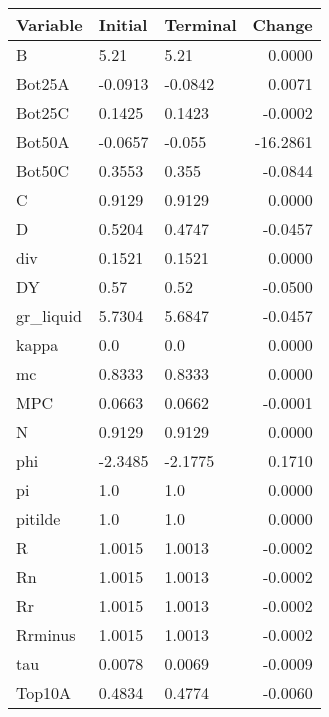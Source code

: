 \begin{table}
\centering
\label{tab:stst_comparison_fast_shock_limit_permanent}
\begin{tabular}{lllr}
\toprule
                Variable & Initial & Terminal &   Change \\
\midrule
                       B &    5.21 &     5.21 &   0.0000 \\
                  Bot25A & -0.0913 &  -0.0842 &   0.0071 \\
                  Bot25C &  0.1425 &   0.1423 &  -0.0002 \\
                  Bot50A & -0.0657 &   -0.055 & -16.2861 \\
                  Bot50C &  0.3553 &    0.355 &  -0.0844 \\
                       C &  0.9129 &   0.9129 &   0.0000 \\
                       D &  0.5204 &   0.4747 &  -0.0457 \\
                     div &  0.1521 &   0.1521 &   0.0000 \\
                      DY &    0.57 &     0.52 &  -0.0500 \\
               gr\_liquid &  5.7304 &   5.6847 &  -0.0457 \\
                   kappa &     0.0 &      0.0 &   0.0000 \\
                      mc &  0.8333 &   0.8333 &   0.0000 \\
                     MPC &  0.0663 &   0.0662 &  -0.0001 \\
                       N &  0.9129 &   0.9129 &   0.0000 \\
                     phi & -2.3485 &  -2.1775 &   0.1710 \\
                      pi &     1.0 &      1.0 &   0.0000 \\
                 pitilde &     1.0 &      1.0 &   0.0000 \\
                       R &  1.0015 &   1.0013 &  -0.0002 \\
                      Rn &  1.0015 &   1.0013 &  -0.0002 \\
                      Rr &  1.0015 &   1.0013 &  -0.0002 \\
                 Rrminus &  1.0015 &   1.0013 &  -0.0002 \\
                     tau &  0.0078 &   0.0069 &  -0.0009 \\
                  Top10A &  0.4834 &   0.4774 &  -0.0060 \\

\end{tabular}
\end{table}
